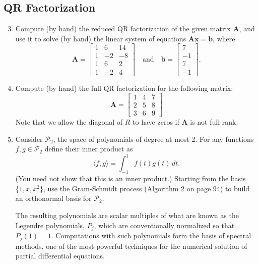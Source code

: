 \documentclass{article}
\begin{document}
\subsection*{QR Factorization}

\begin{enumerate}\setcounter{enumi}{2}
\item Compute (by hand) the reduced QR factorization of the given matrix $\mathbf{A}$, and use it to solve (by hand) the linear system of equations $\mathbf{Ax = b}$, where
\[ \mathbf{A} = \begin{bmatrix} 1 & 6 & 14 \\ 1 & -2 & -8 \\ 1 & 6 & 2 \\ 1 & -2 & 4 \end{bmatrix} \quad \text{and} \quad \mathbf{b} = \begin{bmatrix} 7 \\ -1 \\ 7 \\ -1 \end{bmatrix}. \]

\item Compute (by hand) the full QR factorization for the following matrix:
\[ \mathbf{A} = \begin{bmatrix} 1 & 4 & 7 \\ 2 & 5 & 8 \\ 3 & 6 & 9 \end{bmatrix} \]
Note that we allow the diagonal of $R$ to have zeros if $\mathbf{A}$ is not full rank. 

\item Consider $\mathcal{P}_2$, the space of polynomials of degree at most 2. For any functions $f,g \in \mathcal{P}_2$ define their inner product as
\[ \langle f, g \rangle = \int_{-1}^1 f(t) g(t) \, dt. \]
(You need not show that this is an inner product.) Starting from the basis $\{ 1, x, x^2 \}$, use the Gram-Schmidt process (Algorithm 2 on page 94) to build an orthonormal basis for $\mathcal{P}_2$. 

The resulting polynomials are scalar multiples of what are known as the Legendre polynomials, $P_j$, which are conventionally normalized so that $P_j(1) = 1$. Computations with such polynomials form the basis of spectral methods, one of the most powerful techniques for the numerical solution of partial differential equations.
\end{enumerate}
\end{document}
